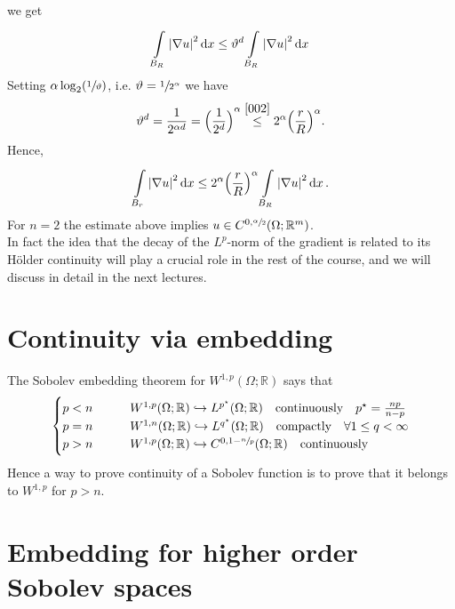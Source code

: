 we get
\begin{gather}
    \int\limits_{B_{R}}^{} \abs{\nabla u}^{2} \dd{x} \leq \vartheta^{d}\int\limits_{B_{R}}^{} \abs{\nabla u}^{2} \dd{x}
\end{gather}
Setting \(\alpha \log_{2}(\sfrac{1}{\vartheta})\), i.e. \(\vartheta = \sfrac{1}{2^{\alpha}}\) we have
\begin{gather}
    \vartheta^{d}= \frac{1}{2^{\alpha d}} = {\Big( \frac{1}{2^{d}} \Big)}^{\alpha} \overset{\eqref{002}}{\leq} 2^{\alpha}{\Big( \frac{r}{R} \Big)}^{\alpha}.
\end{gather}
Hence,
\begin{gather}
    \int\limits_{B_{r}}^{} \abs{\nabla u}^{2} \dd{x} \leq 2^{\alpha} {\Big( \frac{r}{R} \Big)}^{\alpha} \int\limits_{B_{R}}^{} \abs{\nabla u}^{2} \dd{x}.
\end{gather}
For \(n=2\) the estimate above implies \(u \in C^{0, \sfrac{\alpha}{2}}(\Omega; \mathbb{R}^{m})\).\\
In fact the idea that the decay of the \(L^{p}\)-norm of the gradient is related to its Hölder continuity will play a crucial role in the rest of the course, and we will discuss in detail in the next lectures.

\section{Continuity via embedding}

The Sobolev embedding theorem for \(W^{1,p}(\Omega; \mathbb{R})\) says that
\begin{align}
    \begin{cases}
        p<n \qquad   & W^{1,p}(\Omega; \mathbb{R}) \hookrightarrow L^{p^{\star}}(\Omega;\mathbb{R}) \quad \text{continuously} \quad p^{\star}=\frac{np}{n-p} \\
        p=n \qquad   & W^{1,n}(\Omega; \mathbb{R}) \hookrightarrow L^{q^{\star}}(\Omega;\mathbb{R}) \quad \text{compactly} \quad \forall 1 \leq q < \infty   \\
        p > n \qquad & W^{1,p}(\Omega; \mathbb{R}) \hookrightarrow C^{0, 1-\sfrac{n}{p}}(\Omega;\mathbb{R}) \quad \text{continuously}
    \end{cases}
\end{align}
Hence a way to prove continuity of a Sobolev function is to prove that it belongs to \(W^{1,p}\) for \(p>n\).

\section{Embedding for higher order Sobolev spaces}

